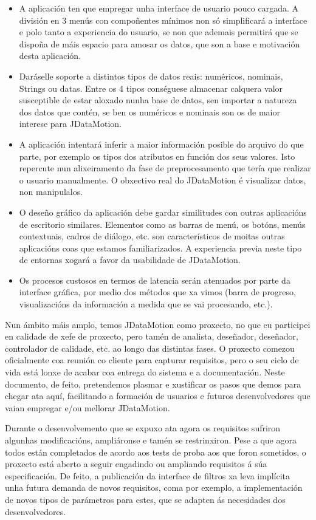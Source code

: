 \begin{itemize}
\item A aplicación ten que empregar unha interface de usuario pouco cargada. A división en 3 menús con compoñentes mínimos non só simplificará a interface e polo tanto a experiencia do usuario, se non que ademais permitirá que se dispoña de máis espacio para amosar os datos, que son a base e motivación desta aplicación.
\item Daráselle soporte a distintos tipos de datos reais: numéricos, nominais, Strings ou datas. Entre os 4 tipos conséguese almacenar calquera valor susceptible de estar aloxado nunha base de datos, sen importar a natureza dos datos que contén, se ben os numéricos e nominais son os de maior interese para JDataMotion.
\item A aplicación intentará inferir a maior información posible do arquivo do que parte, por exemplo os tipos dos atributos en función dos seus valores. Isto repercute nun alixeiramento da fase de preprocesamento que tería que realizar o usuario manualmente. O obxectivo real do JDataMotion é visualizar datos, non manipulalos.
\item O deseño gráfico da aplicación debe gardar similitudes con outras aplicacións de escritorio similares. Elementos como as barras de menú, os botóns, menús contextuais, cadros de diálogo, etc. son característicos de moitas outras aplicacións coas que estamos familiarizados. A experiencia previa neste tipo de entornas xogará a favor da usabilidade de JDataMotion.
\item Os procesos custosos en termos de latencia serán atenuados por parte da interface gráfica, por medio dos métodos que xa vimos (barra de progreso, visualizacións da información a medida que se vai procesando, etc.).
\end{itemize}

Nun ámbito máis amplo, temos JDataMotion como proxecto, no que eu participei en calidade de xefe de proxecto, pero tamén de analista, deseñador, deseñador, controlador de calidade, etc. ao longo  das distintas fases. O proxecto comezou oficialmente coa reunión co cliente para capturar requisitos, pero o seu ciclo de vida está lonxe de acabar coa entrega do sistema e a documentación. Neste documento, de feito, pretendemos plasmar e xustificar os pasos que demos para chegar ata aquí, facilitando a formación de usuarios e futuros desenvolvedores que vaian empregar e/ou mellorar JDataMotion.

Durante o desenvolvemento que se expuxo ata agora os requisitos sufriron algunhas modificacións, ampliáronse e tamén se restrinxiron. Pese a que agora todos están completados de acordo aos tests de proba aos que foron sometidos, o proxecto está aberto a seguir engadindo ou ampliando requisitos á súa especificación. De feito, a publicación da interface de filtros xa leva implícita unha futura demanda de novos requisitos, coma por exemplo, a implementación de novos tipos de parámetros para estes, que se adapten ás necesidades dos desenvolvedores.

